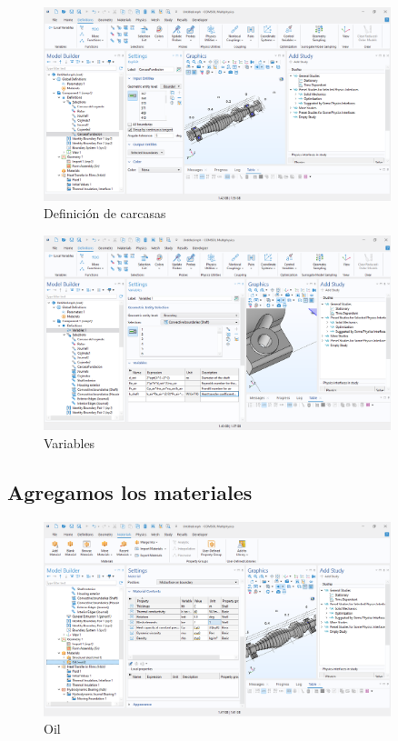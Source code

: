 \documentclass{article}
\theoremstyle{mytheoremstyle}
\theoremstyle{mytheoremstyle}
\theoremstyle{myproblemstyle}
\begin{document}
            \begin{figure}[H] %
              \centering
              \includegraphics[width=0.9\textwidth]{carcas.png}
              \caption{Definición de carcasas} %
              \label{fig:comsol_definicion_carcasas} %
            \end{figure}

            \begin{figure}[H] %
              \centering
              \includegraphics[width=0.9\textwidth]{vari.png}
              \caption{Variables}
              \label{fig:comsol_variables_definicion} %
            \end{figure}
            \subsection{Agregamos los materiales}
               \begin{figure}[H]
              \centering
              \includegraphics[width=0.9\textwidth]{mat2.png}
              \caption{Oil}
              \label{fig:comsol_material_oil} %
            \end{figure}
\end{document}
